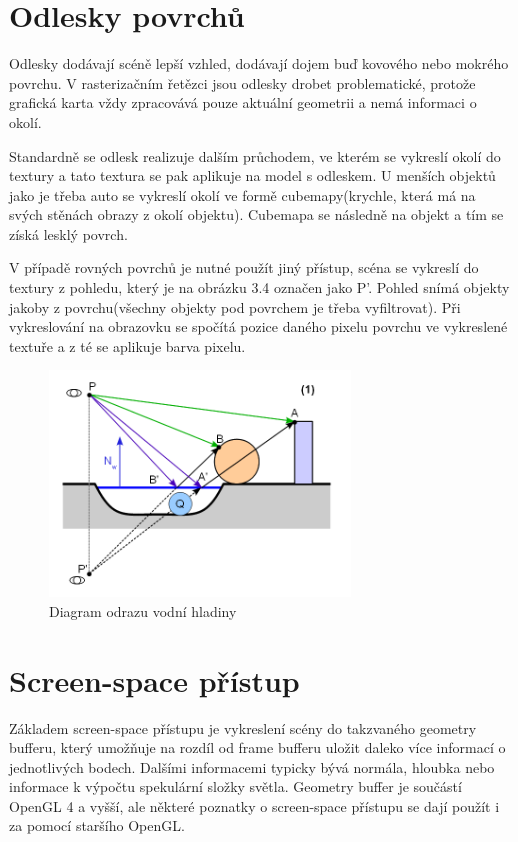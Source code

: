 \documentclass[11pt,twoside,a4paper]{book}
\begin{document}
\section{Odlesky povrchů}
Odlesky dodávají scéně lepší vzhled, dodávají dojem buď kovového nebo mokrého povrchu. V rasterizačním řetězci jsou odlesky drobet problematické, protože grafická karta vždy zpracovává pouze aktuální geometrii a nemá informaci o okolí.

Standardně se odlesk realizuje dalším průchodem, ve kterém se vykreslí okolí do textury a tato textura se pak aplikuje na model s odleskem. U menších objektů jako je třeba auto se vykreslí okolí ve formě cubemapy(krychle, která má na svých stěnách obrazy z okolí objektu). Cubemapa se následně  na objekt a tím se získá lesklý povrch.

V případě rovných povrchů je nutné použít jiný přístup, scéna se vykreslí do textury z pohledu, který je na obrázku 3.4 označen jako P'. Pohled snímá objekty jakoby z povrchu(všechny objekty pod povrchem je třeba vyfiltrovat). Při vykreslování na obrazovku se spočítá pozice daného pixelu povrchu ve vykreslené textuře a z té se aplikuje barva pixelu.

\begin{center}
\begin{figure}[h!]
\includegraphics[width=80mm]{figures/reflection-diagram.png}
\caption{Diagram odrazu vodní hladiny}
\end{figure}
\end{center}

\section{Screen-space přístup}
Základem screen-space přístupu je vykreslení scény do takzvaného geometry bufferu, který umožňuje na rozdíl od frame bufferu uložit daleko více informací o jednotlivých bodech. Dalšími informacemi typicky bývá normála, hloubka nebo informace k výpočtu spekulární složky světla. Geometry buffer je součástí OpenGL 4 a vyšší, ale některé poznatky o screen-space přístupu se dají použít i za pomocí staršího OpenGL.
\end{document}
